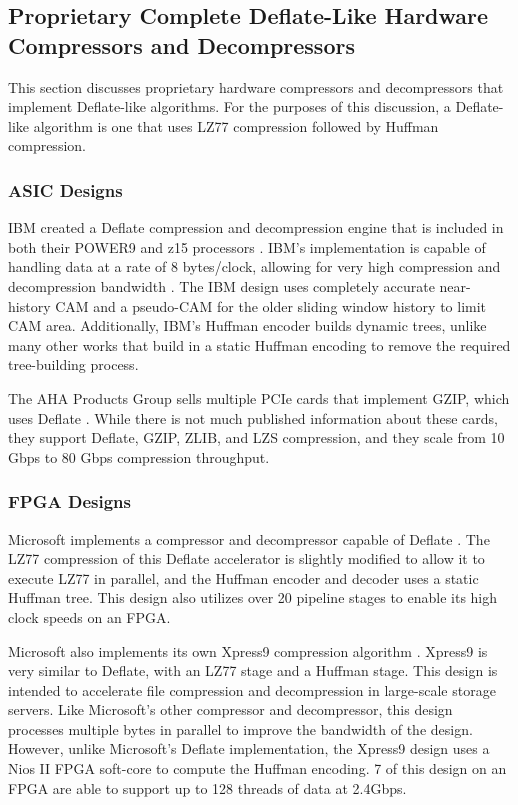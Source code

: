 \documentclass[doublespace,nopageskip]{VTthesis}
\begin{document}
\subsection{Proprietary Complete Deflate-Like Hardware Compressors and Decompressors}\label{ss:complete_deflate-like_hardware_compressors_and_decompressors}
This section discusses proprietary hardware compressors and decompressors that implement Deflate-like algorithms. For the purposes of this discussion, a Deflate-like algorithm is one that uses LZ77 compression followed by Huffman compression.

\subsubsection{ASIC Designs}\label{sss:asic_designs}
IBM created a Deflate compression and decompression engine that is included in both their POWER9 and z15 processors \cite{ibm}. IBM's implementation is capable of handling data at a rate of 8 bytes/clock, allowing for very high compression and decompression bandwidth \cite{ibm}. The IBM design uses completely accurate near-history CAM and a pseudo-CAM for the older sliding window history to limit CAM area. Additionally, IBM's Huffman encoder builds dynamic trees, unlike many other works that build in a static Huffman encoding to remove the required tree-building process.

The AHA Products Group sells multiple PCIe cards that implement GZIP, which uses Deflate \cite{aha}. While there is not much published information about these cards, they support Deflate, GZIP, ZLIB, and LZS compression, and they scale from 10 Gbps to 80 Gbps compression throughput.

\subsubsection{FPGA Designs}\label{sss:fpga_designs}

Microsoft implements a compressor and decompressor capable of Deflate \cite{microsoft}. The LZ77 compression of this Deflate accelerator is slightly modified to allow it to execute LZ77 in parallel, and the Huffman encoder and decoder uses a static Huffman tree. This design also utilizes over 20 pipeline stages to enable its high clock speeds on an FPGA.

Microsoft also implements its own Xpress9 compression algorithm \cite{xpress9}. Xpress9 is very similar to Deflate, with an LZ77 stage and a Huffman stage. This design is intended to accelerate file compression and decompression in large-scale storage servers. Like Microsoft's other compressor and decompressor, this design processes multiple bytes in parallel to improve the bandwidth of the design. However, unlike Microsoft's Deflate implementation, the Xpress9 design uses a Nios II FPGA soft-core to compute the Huffman encoding. 7 of this design on an FPGA are able to support up to 128 threads of data at 2.4Gbps.
\end{document}
